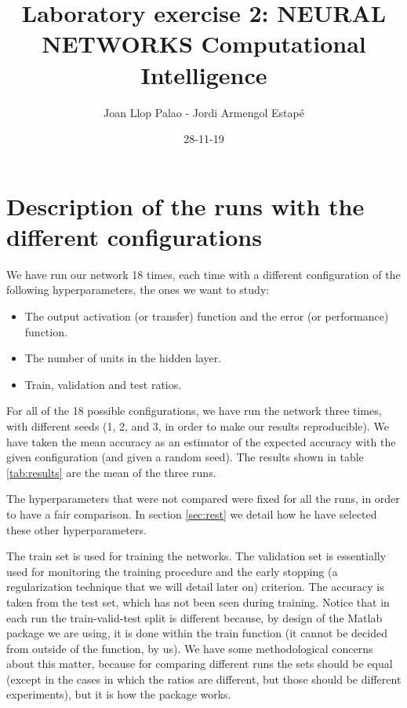 \documentclass{article}[11pt]
\title{\vspace{-2.0cm}Laboratory exercise 2: NEURAL NETWORKS
                        \bigskip
                        \LARGE{Computational Intelligence}}
\author{Joan Llop Palao - Jordi Armengol Estapé}
\date{28-11-19}
\begin{document}
\maketitle


\section{Description of the runs with the different configurations}
We have run our network 18 times, each time with a different configuration of the following hyperparameters, the ones we want to study:
\begin{itemize}
    \item The output activation (or transfer) function and the error (or performance) function.
    \item The number of units in the hidden layer.
    \item Train, validation and test ratios.
\end{itemize}
For all of the 18 possible configurations, we have run the network three times, with different seeds (1, 2, and 3, in order to make our results reproducible). We have taken the mean accuracy as an estimator of the expected accuracy with the given configuration (and given a random seed). The results shown in table \ref{tab:results} are the mean of the three runs.

The hyperparameters that were not compared were fixed for all the runs, in order to have a fair comparison. In section \ref{sec:rest} we detail how he have selected these other hyperparameters.

The train set is used for training the networks. The validation set is essentially used for monitoring the training procedure and the early stopping (a regularization technique that we will detail later on) criterion. The accuracy is taken from the test set, which has not been seen during training. Notice that in each run the train-valid-test split is different because, by design of the Matlab package we are using, it is done within the train function (it cannot be decided from outside of the function, by us). We have some methodological concerns about this matter, because for comparing different runs the sets should be equal (except in the cases in which the ratios are different, but those should be different experiments), but it is how the package works.
\end{document}
